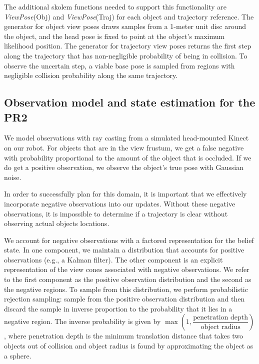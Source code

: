 The additional skolem functions needed to support this functionality
are \emph{ViewPose}(Obj) and \emph{ViewPose}(Traj) for each object and
trajectory reference. The generator for object view poses draws
samples from a 1-meter unit disc around the object, and the head pose
is fixed to point at the object's maximum likelihood position. The
generator for trajectory view poses returns the first step along the
trajectory that has non-negligible probability of being in
collision. To observe the uncertain step, a viable base pose is
sampled from regions with negligible collision probability along the
same trajectory.

\subsection{Observation model and state estimation for the PR2}
We model observations with ray casting from a simulated head-mounted
Kinect on our robot. For objects that are in the view
frustum, we get a false negative with probability proportional to the
amount of the object that is occluded. If we do get a positive
observation, we observe the object's true pose with Gaussian noise.


In order to successfully plan for this domain, it is important that we
effectively incorporate negative observations into our
updates. Without these negative observations, it is impossible to determine
if a trajectory is clear without observing actual objects
locations. 

We account for negative observations with a factored representation
for the belief state. In one component, we maintain a distribution
that accounts for positive observations (e.g., a Kalman filter). The
other component is an explicit representation of the view cones
associated with negative observations. We refer to the first component
as the positive observation distribution and the second as the
negative regions. To sample from this distribution, we perform
probabilistic rejection sampling: sample from the positive observation
distribution and then discard the sample in inverse proportion to the
probability that it lies in a negative region. The inverse
probability is given by $\max(1,\dfrac{\text{penetration
    depth}}{\text{object radius}})$, where penetration depth is the
minimum translation distance that takes two objects out of collision and object
radius is found by approximating the object as a sphere.


